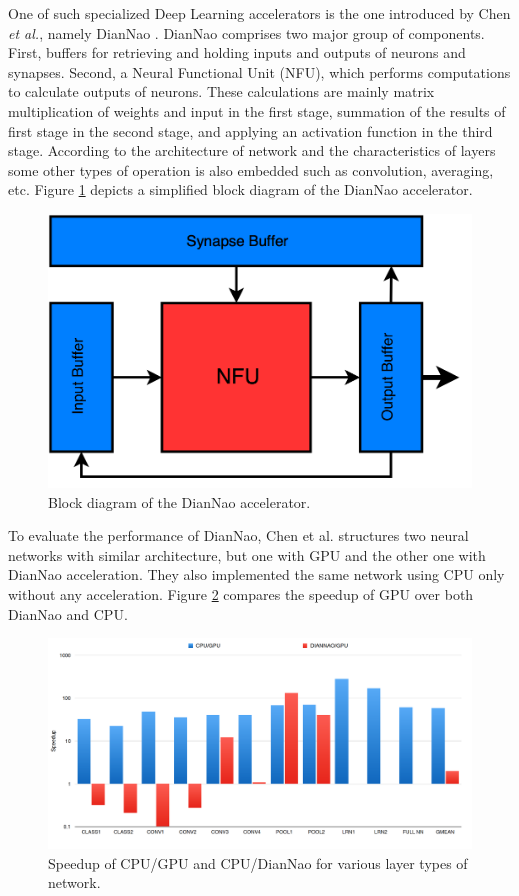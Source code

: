 \documentclass[runningheads,a4paper]{llncs}
\begin{document}
{One of such specialized Deep Learning accelerators is the one introduced by Chen \textit{et al.}, namely DianNao \cite{chen2014diannao}. DianNao comprises two major group of components. First, buffers for retrieving and holding inputs and outputs of neurons and synapses. Second, a Neural Functional Unit (NFU), which performs computations to calculate outputs of neurons. These calculations are mainly matrix multiplication of weights and input in the first stage, summation of the results of first stage in the second stage, and applying an activation function in the third stage. According to the architecture of network and the characteristics of layers some other types of operation is also embedded such as convolution, averaging, etc. Figure \ref{fig:diannao_arch} depicts a simplified block diagram of the DianNao accelerator.
\begin{figure}[h]
	\includegraphics[scale=0.23]{./images/diannao.png}
	\centering
	\caption{Block diagram of the DianNao accelerator\cite{chen2014dadiannao}.}
	\label{fig:diannao_arch}
\end{figure}
To evaluate the performance of DianNao, Chen et al. structures two neural networks with similar architecture, but one with GPU and the other one with DianNao acceleration. They also implemented the same network using CPU only without any acceleration. Figure \ref{fig:diannao_speedup} compares the speedup of GPU over both DianNao and CPU.
\begin{figure}[h]
	\includegraphics[width=\textwidth]{./images/diannao_results.png}
	\centering
	\caption{Speedup of CPU/GPU and CPU/DianNao for various layer types of network\cite{chen2014dadiannao}.}
	\label{fig:diannao_speedup}
\end{figure}

}
\end{document}
